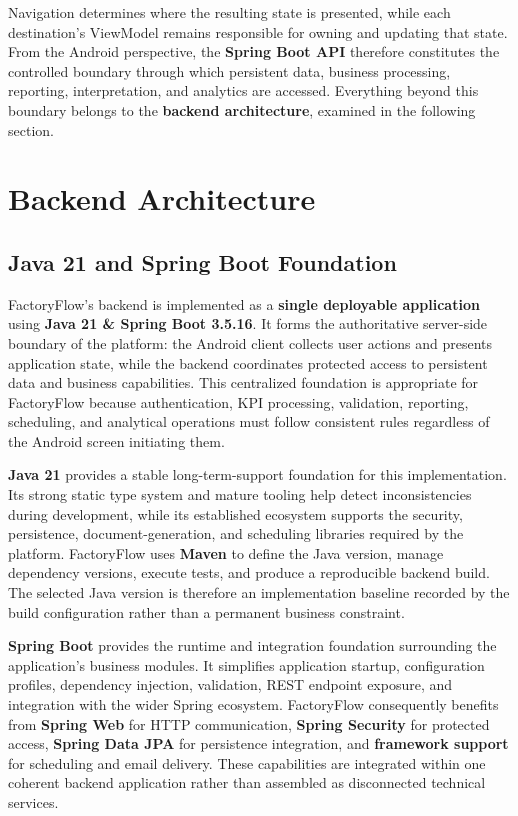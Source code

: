 Navigation determines where the resulting state is presented, while each destination's ViewModel remains responsible for owning and updating that state. From the Android perspective, the \textbf{Spring Boot API} therefore constitutes the controlled boundary through which persistent data, business processing, reporting, interpretation, and analytics are accessed. Everything beyond this boundary belongs to the \textbf{backend architecture}, examined in the following section.

\section{Backend Architecture}

\subsection{Java 21 and Spring Boot Foundation}
\label{subsec:backend-java-spring-boot}

FactoryFlow's backend is implemented as a \textbf{single deployable application} using \textbf{Java 21 \& Spring Boot 3.5.16}. It forms the authoritative server-side boundary of the platform: the Android client collects user actions and presents application state, while the backend coordinates protected access to persistent data and business capabilities. This centralized foundation is appropriate for FactoryFlow because authentication, KPI processing, validation, reporting, scheduling, and analytical operations must follow consistent rules regardless of the Android screen initiating them.

\textbf{Java 21} provides a stable long-term-support foundation for this implementation. Its strong static type system and mature tooling help detect inconsistencies during development, while its established ecosystem supports the security, persistence, document-generation, and scheduling libraries required by the platform. FactoryFlow uses \textbf{Maven} to define the Java version, manage dependency versions, execute tests, and produce a reproducible backend build. The selected Java version is therefore an implementation baseline recorded by the build configuration rather than a permanent business constraint.

\textbf{Spring Boot} provides the runtime and integration foundation surrounding the application's business modules. It simplifies application startup, configuration profiles, dependency injection, validation, REST endpoint exposure, and integration with the wider Spring ecosystem. FactoryFlow consequently benefits from \textbf{Spring Web} for HTTP communication, \textbf{Spring Security} for protected access, \textbf{Spring Data JPA} for persistence integration, and \textbf{framework support} for scheduling and email delivery. These capabilities are integrated within one coherent backend application rather than assembled as disconnected technical services.

